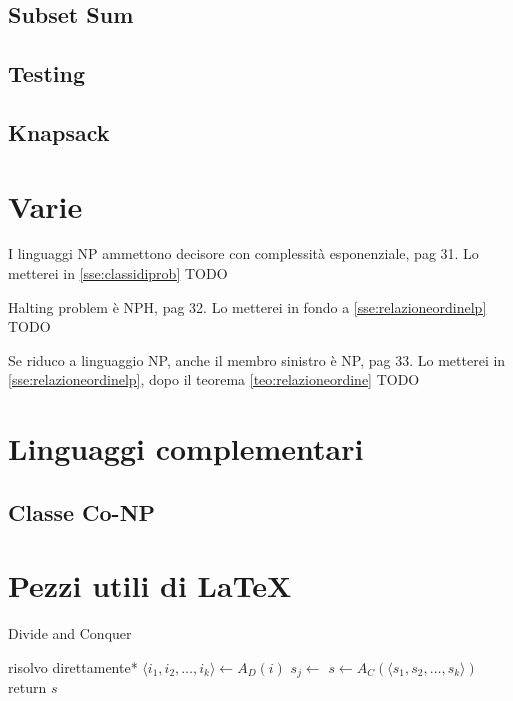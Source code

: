 \subsection{Subset Sum}

\subsection{Testing}

\subsection{Knapsack}

\section{Varie}
I linguaggi NP ammettono decisore con complessità esponenziale, pag 31.
Lo metterei in \ref{sse:classidiprob}
TODO

Halting problem è NPH, pag 32.
Lo metterei in fondo a \ref{sse:relazioneordinelp}
TODO

Se riduco a linguaggio NP, anche il membro sinistro è NP, pag 33.
Lo metterei in \ref{sse:relazioneordinelp}, dopo il teorema \ref{teo:relazioneordine}
TODO

\section{Linguaggi complementari}

\subsection{Classe Co-NP}


\section{Pezzi utili di \LaTeX{}}
\begin{algorithm}[H]
\caption{Divide and Conquer}\label{alg:dnc}
\begin{algorithmic}[1]
            \State *risolvo direttamente*
        \EndIf
        \State $\langle i_1, i_2, \dots, i_k \rangle \gets A_D(i)$ 
            \State $s_j \gets $ 
        \EndFor
        \State $s \gets A_C(\langle s_1, s_2, \dots, s_k \rangle)$
        \State return $s$
    \EndProcedure
\end{algorithmic}
\end{algorithm}


